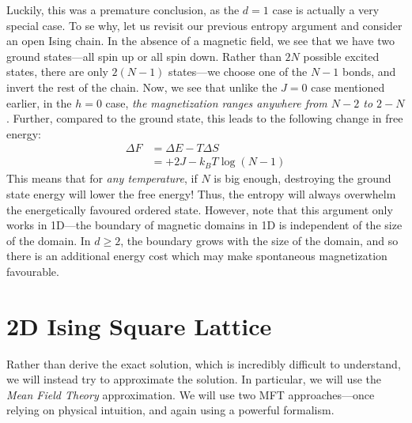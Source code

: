 Luckily, this was a premature conclusion, as the \(d=1\) case is actually a very special case. To se why, let us revisit our previous entropy argument and consider an open Ising chain. In the absence of a magnetic field, we see that we have two ground states---all spin up or all spin down. Rather than \(2N\) possible excited states, there are only \(2(N-1)\) states---we choose one of the \(N-1\) bonds, and invert the rest of the chain. Now, we see that unlike the \(J=0\) case mentioned earlier, in the \(h=0\) case, \emph{the magnetization ranges anywhere from \(N-2\) to \(2-N\)}. Further, compared to the ground state, this leads to the following change in free energy:
\begin{align*}
	\Delta F &= \Delta E-T\Delta S\\
		 &= +2J-k_BT\log(N-1)
\end{align*}
This means that for \emph{any temperature}, if \(N\) is big enough, destroying the ground state energy will lower the free energy! Thus, the entropy will always overwhelm the energetically favoured ordered state. However, note that this argument only works in 1D---the boundary of magnetic domains in 1D is independent of the size of the domain. In \(d\geq 2\), the boundary grows with the size of the domain, and so there is an additional energy cost which may make spontaneous magnetization favourable.

\section{2D Ising Square Lattice}
Rather than derive the exact solution, which is incredibly difficult to understand, we will instead try to approximate the solution. In particular, we will use the \emph{Mean Field Theory} approximation. We will use two MFT approaches---once relying on physical intuition, and again using a powerful formalism.
